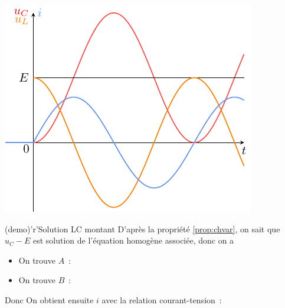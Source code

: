 \documentclass[../../main/main.tex]{subfiles}
\begin{document}
\begin{tcbraster}[raster columns=2, raster equal height=rows]
\begin{tcolorbox}[blankest, raster multicolumn=1, space to=\myspace]
\begin{tcbraster}[raster columns=1]
\begin{tcb}[width=\linewidth]
\begin{center}
{						\includegraphics[width=\linewidth]{carac-lc_montant-harmonique}
					}
				\end{center}
			\end{tcb}
		\end{tcbraster}
	\end{tcolorbox}
	\begin{tcb}[label=demo:rcsolu](demo)'r'{Solution LC montant}
		D'après la propriété \ref{prop:chvar}, on sait que $u_C - E$ est
		solution de l'équation homogène associée, donc on a
		\psw{
			\[
				u_C(t) - E = A\cos(\w_0 t) + B\sin(\w_0 t)
			\]
		}
		\vspace{-15pt}
		\begin{itemize}
			\item On trouve $A$~:
			      \psw{
				      \[
					      u_C(0) - E = A
					      \Ra \boxed{A = -E}
				      \]
			      }
			      \vspace{-15pt}
			\item On trouve $B$~:
			      \vspace{-15pt}
		\end{itemize}
		Donc
		\psw{
			\[
				\boxed{u_C (t) = E \left( 1 - \cos(\w_0t) \right)}
			\]
		}
		On obtient ensuite $i$ avec la relation courant-tension~:
		\psw{
			\[
				i(t) = C \dv{u_c}{t} = CE \w_0 \sin(\w_0t)
			\]
		}
		\vspace{-15pt}
	\end{tcb}
\end{tcbraster}
\end{document}
